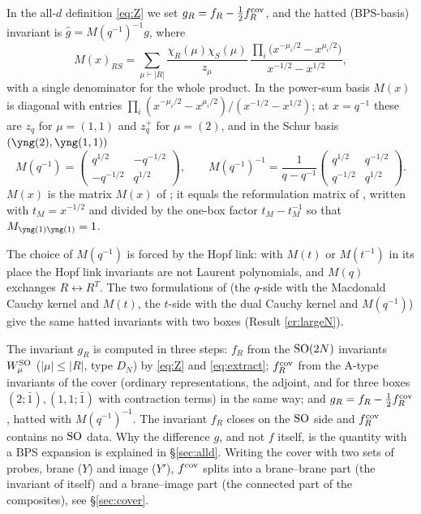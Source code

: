 \begin{definition}\label{def:crosscap}
In the all-$d$ definition \eqref{eq:Z} we set $g_R = f_R - \tfrac12 f^{\mathrm{cov}}_R$, and the hatted (BPS-basis) invariant is $\hat g = M(q^{-1})^{-1} g$, where
\begin{equation}\label{eq:M}
M(x)_{RS} = \sum_{\mu \vdash |R|} \frac{\chi_R(\mu)\chi_S(\mu)}{z_\mu}\,\frac{\prod_i \bigl(x^{-\mu_i/2} - x^{\mu_i/2}\bigr)}{x^{-1/2} - x^{1/2}} ,
\end{equation}
with a single denominator for the whole product. In the power-sum basis $M(x)$ is diagonal with entries $\prod_i(x^{-\mu_i/2} - x^{\mu_i/2})/(x^{-1/2} - x^{1/2})$; at $x = q^{-1}$ these are $z_q$ for $\mu = (1,1)$ and $z_q^+$ for $\mu = (2)$, and in the Schur basis $(\ytwo, \yoneone)$
\begin{equation}\label{eq:M2}
M(q^{-1}) = \begin{pmatrix} q^{1/2} & -q^{-1/2} \\ -q^{-1/2} & q^{1/2} \end{pmatrix},\qquad
M(q^{-1})^{-1} = \frac{1}{q - q^{-1}}\begin{pmatrix} q^{1/2} & q^{-1/2} \\ q^{-1/2} & q^{1/2} \end{pmatrix}.
\end{equation}
$M(x)$ is the matrix $M(x)$ of \cite{KN17}; it equals the reformulation matrix of \cite{Marino09}, written with $t_M = x^{-1/2}$ and divided by the one-box factor $t_M - t_M^{-1}$ so that $M_{\yone\yone} = 1$.
\end{definition}

The choice of $M(q^{-1})$ is forced by the Hopf link: with $M(t)$ or $M(t^{-1})$ in its place the Hopf link invariants are not Laurent polynomials, and $M(q)$ exchanges $R \leftrightarrow R^T$. The two formulations of \cite{KN17} (the $q$-side with the Macdonald Cauchy kernel and $M(t)$, the $t$-side with the dual Cauchy kernel and $M(q^{-1})$) give the same hatted invariants with two boxes (Result \ref{cr:largeN}).

The invariant $g_R$ is computed in three steps: $f_R$ from the $\mathrm{SO}(2N)$ invariants $W^{\mathrm{SO}}_\mu$ ($|\mu| \le |R|$, type $D_N$) by \eqref{eq:Z} and \eqref{eq:extract}; $f^{\mathrm{cov}}_R$ from the A-type invariants of the cover (ordinary representations, the adjoint, and for three boxes $(2;\bar1), (1,1;\bar1)$ with contraction terms) in the same way; and $g_R = f_R - \tfrac12 f^{\mathrm{cov}}_R$, hatted with $M(q^{-1})^{-1}$. The invariant $f_R$ closes on the $\mathrm{SO}$ side and $f^{\mathrm{cov}}_R$ contains no $\mathrm{SO}$ data. Why the difference $g$, and not $f$ itself, is the quantity with a BPS expansion is explained in \S\ref{sec:alld}. Writing the cover with two sets of probes, brane ($Y$) and image ($Y'$), $f^{\mathrm{cov}}$ splits into a brane--brane part (the invariant of \cite{KN17} itself) and a brane--image part (the connected part of the composites), see \S\ref{sec:cover}.

